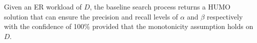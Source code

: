 \begin{theorem} \label{theorem-baseline}
  Given an ER workload of $D$, the baseline search process returns a HUMO solution that can ensure the precision and recall levels of $\alpha$ and $\beta$ respectively with the confidence of 100\% provided that the monotonicity assumption holds on $D$.
\end{theorem}


